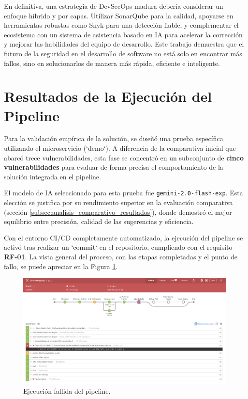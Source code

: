 En definitiva, una estrategia de DevSecOps madura debería considerar un enfoque híbrido y por capas. Utilizar SonarQube para la calidad, apoyarse en herramientas robustas como Snyk para una detección fiable, y complementar el ecosistema con un sistema de asistencia basado en IA para acelerar la corrección y mejorar las habilidades del equipo de desarrollo. Este trabajo demuestra que el futuro de la seguridad en el desarrollo de software no está solo en encontrar más fallos, sino en solucionarlos de manera más rápida, eficiente e inteligente.

\section{Resultados de la Ejecución del Pipeline}
\label{subsec:analisis_resultados_pipeline}

Para la validación empírica de la solución, se diseñó una prueba específica utilizando el microservicio (`demo`). A diferencia de la comparativa inicial que abarcó trece vulnerabilidades, esta fase se concentró en un subconjunto de \textbf{cinco vulnerabilidades} para evaluar de forma precisa el comportamiento de la solución integrada en el pipeline.

El modelo de IA seleccionado para esta prueba fue \texttt{gemini-2.0-flash-exp}. Esta elección se justifica por su rendimiento superior en la evaluación comparativa (sección \ref{subsec:analisis_comparativo_resultados}), donde demostró el mejor equilibrio entre precisión, calidad de las sugerencias y eficiencia.

Con el entorno CI/CD completamente automatizado, la ejecución del pipeline se activó tras realizar un `commit` en el repositorio, cumpliendo con el requisito \textbf{RF-01}. La vista general del proceso, con las etapas completadas y el punto de fallo, se puede apreciar en la Figura \ref{fig:pipeline_general_fail}.

\begin{figure}[h]
\centering
\includegraphics[width=0.99\textwidth]{contenido/imagenes/4_pipeline_fail.png}
\caption{Ejecución fallida del pipeline.}
\label{fig:pipeline_general_fail}
\end{figure}

